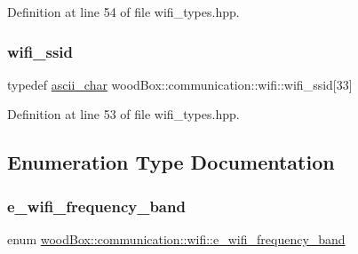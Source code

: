 Definition at line 54 of file wifi\+\_\+types.\+hpp.

\mbox{\label{namespacewood_box_1_1communication_1_1wifi_a6e704a61f3a7acac7425400dff34d68f}} 
\subsubsection{\texorpdfstring{wifi\+\_\+ssid}{wifi\_ssid}}
{\footnotesize\ttfamily typedef \mbox{\hyperlink{namespacewood_box_1_1communication_1_1wifi_a29995934e86031637bb2e0d8192cc467}{ascii\+\_\+char}} wood\+Box\+::communication\+::wifi\+::wifi\+\_\+ssid\mbox{[}33\mbox{]}}



Definition at line 53 of file wifi\+\_\+types.\+hpp.



\subsection{Enumeration Type Documentation}
\mbox{\label{namespacewood_box_1_1communication_1_1wifi_af013313f9ec21bfe5a151b90972bcfad}} 
\subsubsection{\texorpdfstring{e\+\_\+wifi\+\_\+frequency\+\_\+band}{e\_wifi\_frequency\_band}}
{\footnotesize\ttfamily enum \mbox{\hyperlink{namespacewood_box_1_1communication_1_1wifi_af013313f9ec21bfe5a151b90972bcfad}{wood\+Box\+::communication\+::wifi\+::e\+\_\+wifi\+\_\+frequency\+\_\+band}}}

